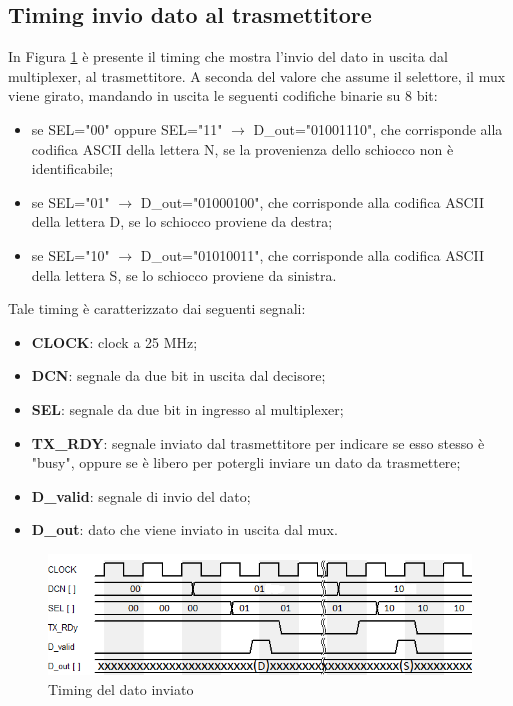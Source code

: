 \documentclass[a4paper, titlepage]{article}
\begin{document}
\subsection{Timing invio dato al trasmettitore}
In Figura \ref{fig:timing_small} è presente il timing che mostra l'invio del dato in uscita dal multiplexer, al trasmettitore. A seconda del valore che assume il selettore, il mux viene girato, mandando in uscita le seguenti codifiche binarie su 8 bit:
\begin{itemize}
    \item se SEL="00" oppure SEL="11" $\longrightarrow$ D\_out="01001110", che corrisponde alla codifica ASCII della lettera N, se la provenienza dello schiocco non è identificabile;
    \item se SEL="01" $\longrightarrow$ D\_out="01000100", che corrisponde alla codifica ASCII della lettera D, se lo schiocco proviene da destra;
    \item se SEL="10" $\longrightarrow$ D\_out="01010011", che corrisponde alla codifica ASCII della lettera S, se lo schiocco proviene da sinistra.
\end{itemize}
Tale timing è caratterizzato dai seguenti segnali:
\begin{itemize}
    \item \textbf{CLOCK}: clock a 25 MHz; 
    \item \textbf{DCN}: segnale da due bit in uscita dal decisore;
    \item \textbf{SEL}: segnale da due bit in ingresso al multiplexer;
    \item \textbf{TX\_RDY}: segnale inviato dal trasmettitore per indicare se esso stesso è "busy", oppure se è libero per potergli inviare un dato da trasmettere;
    \item \textbf{D\_valid}: segnale di invio del dato;
    \item \textbf{D\_out}: dato che viene inviato in uscita dal mux.
\end{itemize}
\begin{figure}[H]
    \centering
    \includegraphics[width=1\textwidth]{timing_cu_mic.png}
    \caption{Timing del dato inviato}
    \label{fig:timing_small}
\end{figure}
\end{document}
